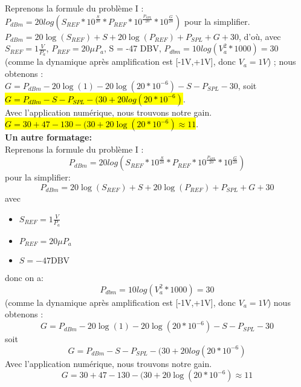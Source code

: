 Reprenons la formule du problème I :$P_{dBm} = 20log(S_{REF}*10^\frac{S}{20}*P_{REF}*10^\frac{P_{SPL}}{20}*10^\frac{G}{20})$ pour la simplifier. $P_{dBm} = 20\log(S_{REF}) + S + 20\log(P_{REF}) + P_{SPL} + G + 30$, d'où, avec $S_{REF} = 1\frac{V}{P_a}$, $P_{REF} = 20\mu P_a$, S = -47 DBV, $P_{dbm} = 10log(V_a^2 * 1000) = 30$ (comme la dynamique après amplification est [-1V,+1V], donc $V_a = 1V$) ; nous obtenons :
\\
$G = P_{dBm} - 20\log(1) - 20\log(20*10^{-6}) - S - P_{SPL} - 30 $, soit
\\
\hl{$G = P_{dBm} - S - P_{SPL} - (30 + 20log(20*10^{-6})$}.
\\
Avec l'application numérique, nous trouvons notre gain.
\\
\hl{$G = 30 + 47 - 130 -(30 + 20\log(20*10^{-6}) \approx 11$}.\\





\textbf{Un autre formatage:}\\


Reprenons la formule du problème I :
\begin{equation}
    P_{dBm} = 20log(S_{REF}*10^\frac{S}{20}*P_{REF}*10^\frac{P_{SPL}}{20}*10^\frac{G}{20})
\end{equation}
pour la simplifier: 
\begin{equation}
    P_{dBm} = 20\log(S_{REF}) + S + 20\log(P_{REF}) + P_{SPL} + G + 30
\end{equation}
avec 
\begin{itemize}
    \item $S_{REF} = 1\frac{V}{P_a}$
    \item $P_{REF} = 20\mu P_a$
    \item $S = -47 \text{DBV}$
\end{itemize}
donc on a:
\begin{equation}
    P_{dbm} = 10log(V_a^2 * 1000) = 30
\end{equation}
(comme la dynamique après amplification est [-1V,+1V], donc $V_a = 1V$)
nous obtenons :
\begin{equation}
    G = P_{dBm} - 20\log(1) - 20\log(20*10^{-6}) - S - P_{SPL} - 30 
\end{equation}
soit
\begin{equation}
G = P_{dBm} - S - P_{SPL} - (30 + 20log(20*10^{-6})
\end{equation}
Avec l'application numérique, nous trouvons notre gain.
\begin{equation}
    G = 30 + 47 - 130 -(30 + 20\log(20*10^{-6}) \approx 11
\end{equation}
